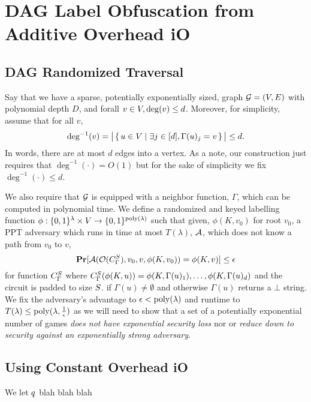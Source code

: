 \section{DAG Label Obfuscation from Additive Overhead iO}
\subsection{DAG Randomized Traversal}
Say that we have a sparse, potentially exponentially sized, graph $\mathcal{G} = (V, E)$ with polynomial depth $D$,
and forall $v \in V, \deg(v) \leq d$. Moreover, for simplicity,
assume that for all $v$, 
$$
\deg^{-1}(v) = \big|\set{u \in V \mid \exists j \in [d], \Gamma(u)_j = v}\big| \leq d.
$$
In words, there are at most $d$ edges into a vertex. As a note, our construction just requires
that $\deg^{-1}(\cdot) = O(1)$ but for the sake of simplicity we fix $\deg^{-1}(\cdot) \leq d$.

We also require that $\mathcal{G}$ is equipped with a neighbor function, $\Gamma$, which can be computed in polynomial time.
We define a randomized and keyed labelling function $\phi: \{0,1\}^\lambda \times V \rightarrow \{0,1\}^{\operatorname{poly}(\lambda)}$ 
such that given, $\phi(K, v_0)$ for root $v_0$, a PPT adversary which runs in time at most $T(\lambda)$, $\mathcal{A}$, which does not know a path from $v_0$ to $v$,
\begin{equation}
	\label{eq:guessPhi}
	\operatorname*{\mathbf{Pr}}[\mathcal{A}(\mathcal{O}({C_\Gamma^S}), v_0, v, \phi(K, v_0)) = \phi(K, v)] \leq \epsilon
\end{equation}
for function ${C_\Gamma^S}$ where ${C_\Gamma^S}(\phi(K, u)) = \phi(K, \Gamma(u)_1), \dots, \phi(K, \Gamma(u)_d)$ and the circuit is padded to size $S$.
if $\Gamma(u) \neq \emptyset$ and otherwise $\Gamma(u)$ returns a $\bot$ string.
We fix the adversary's advantage to $\epsilon < \operatorname{poly}(\lambda)$ and runtime to $T(\lambda) \leq \operatorname{poly}(\lambda, \frac{1}{\epsilon})$
as we will need to show
that a set of a potentially exponential number of games \emph{does not have exponential security loss}
nor or \emph{reduce down to security against an exponentially strong adversary}.

\subsection{Using Constant Overhead iO}
\label{def:constOverheadParam}

We let $q$ blah blah blah

